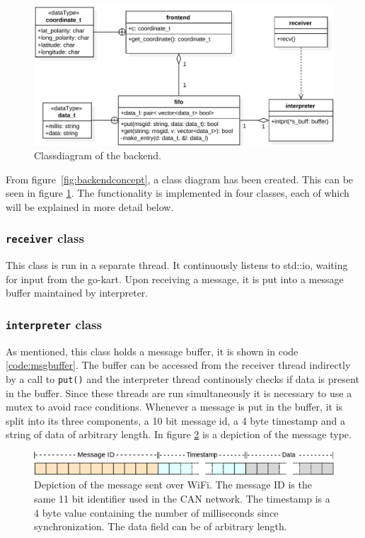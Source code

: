 \begin{figure}[H]
	\includegraphics[width=\linewidth]{graphics/backend_class_diagram}
	\caption[Backend class diagram.]{Classdiagram of the backend.}
	\label{fig:backendclass}
\end{figure}
From figure~\ref{fig:backendconcept}, a class diagram has been created.
This can be seen in figure \ref{fig:backendclass}.
The functionality is implemented in four classes, each of which will be explained in more detail below.

\subsubsection*{\texttt{receiver} class}
This class is run in a separate thread.
It continuously listens to std::io, waiting for input from the go-kart.
Upon receiving a message, it is put into a message buffer maintained by interpreter.

\subsubsection*{\texttt{interpreter} class}\label{sub:backend_intepreter}
As mentioned, this class holds a message buffer, it is shown in code \ref{code:msgbuffer}.
The buffer can be accessed from the receiver thread indirectly by a call to \texttt{put()} and the interpreter thread continously checks if data is present in the buffer.
Since these threads are run simultaneously it is necessary to use a mutex to avoid race conditions.
Whenever a message is put in the buffer, it is split into its three components, a 10 bit message id, a 4 byte timestamp and a string of data of arbitrary length.
In figure \ref{fig:backendmsg} is a depiction of the message type.
\begin{figure}[H]
	\includegraphics[width=\linewidth]{graphics/backend_message}
	\caption[Front end message.]{Depiction of the message sent over WiFi. The message ID is the same 11 bit identifier used in the CAN network.
	The timestamp is a 4 byte value containing the number of milliseconds since synchronization.
	The data field can be of arbitrary length.}
	\label{fig:backendmsg}
\end{figure}

